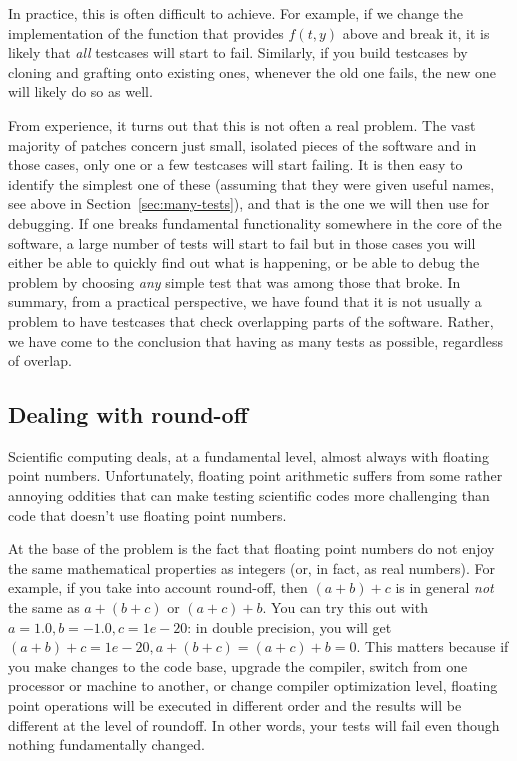 \documentclass{article}
\begin{document}
In practice, this is often difficult to achieve. For example, if we change the
implementation of the function that provides $f(t,y)$ above and break it, it
is likely that \textit{all} testcases will start to fail. Similarly, if you
build testcases by cloning and grafting onto existing ones, whenever the old
one fails, the new one will likely do so as well.

From experience, it turns out that this is not often a real problem. The vast
majority of patches concern just small, isolated pieces of the software and in
those cases, only one or a few testcases will start failing. It is then easy
to identify the simplest one of these (assuming that they were given useful
names, see above in Section~\ref{sec:many-tests}), and that is the one we
will then use for debugging. If one breaks fundamental functionality somewhere
in the core of the software, a large number of tests will start to fail
but in those cases you will either be able to quickly find out what is
happening, or be able to debug the problem by choosing \textit{any} simple
test that was among those that broke. In summary, from a practical
perspective, we have found that it is not usually a problem to have testcases
that check overlapping parts of the software. Rather, we have come to the
conclusion that having as many tests as possible, regardless of overlap.


\subsection{Dealing with round-off}

Scientific computing deals, at a fundamental level, almost always with
floating point numbers. Unfortunately, floating point arithmetic suffers from
some rather annoying oddities that can make testing scientific codes more
challenging than code that doesn't use floating point numbers.

At the base of the problem is the fact that floating point numbers do not
enjoy the same mathematical properties as integers (or, in fact, as real
numbers). For example, if you take into account round-off, then $(a+b)+c$ is in
general \textit{not} the same as $a+(b+c)$ or $(a+c)+b$. You can try this out
with $a=1.0, b=-1.0, c=1e-20$: in double precision, you will get
$(a+b)+c=1e-20, a+(b+c)=(a+c)+b=0$. This matters because if you make changes
to the code base, upgrade the compiler, switch from one processor or machine
to another, or change compiler optimization level, floating point operations
will be executed in different order and the results will be different at the
level of roundoff. In other words, your tests will fail even though
nothing fundamentally changed.
\end{document}
